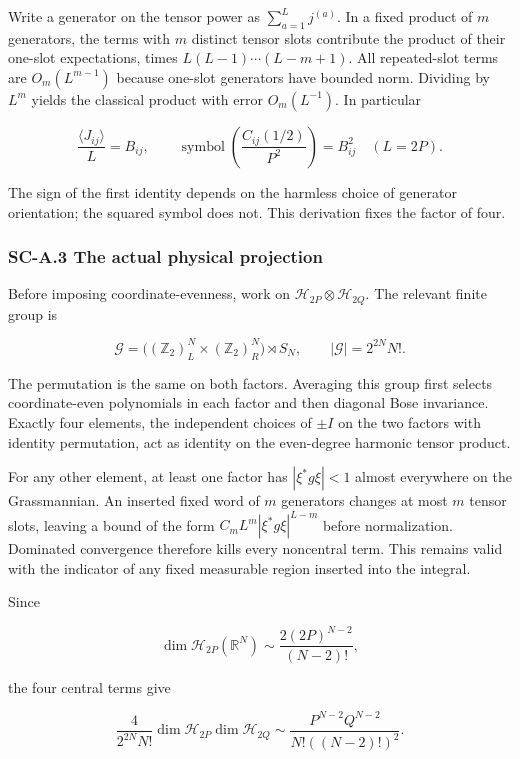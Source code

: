 \documentclass[a4paper,11pt]{article}
\numberwithin{equation}{section}
\begin{document}
Write a generator on the tensor power as \(\sum_{a=1}^L j^{(a)}\). In a fixed product of \(m\) generators, the terms with \(m\) distinct tensor slots contribute the product of their one-slot expectations, times \(L(L-1)\cdots(L-m+1)\). All repeated-slot terms are \(O_m(L^{m-1})\) because one-slot generators have bounded norm. Dividing by \(L^m\) yields the classical product with error \(O_m(L^{-1})\). In particular

\[
\frac{\langle J_{ij}\rangle}{L}=B_{ij},\qquad
\operatorname{symbol}\left(\frac{C_{ij}(1/2)}{P^2}\right)=B_{ij}^2
\quad(L=2P).
\]

The sign of the first identity depends on the harmless choice of generator orientation; the squared symbol does not. This derivation fixes the factor of four.

\hypertarget{sc-a.3-the-actual-physical-projection}{%
\subsubsection{SC-A.3 The actual physical projection}\label{sc-a.3-the-actual-physical-projection}}

Before imposing coordinate-evenness, work on \(\mathcal H_{2P}\otimes\mathcal H_{2Q}\). The relevant finite group is

\[
\mathcal G=\big((\mathbb Z_2)^N_L\times(\mathbb Z_2)^N_R\big)\rtimes S_N,
\qquad |\mathcal G|=2^{2N}N!.
\]

The permutation is the same on both factors. Averaging this group first selects coordinate-even polynomials in each factor and then diagonal Bose invariance. Exactly four elements, the independent choices of \(\pm I\) on the two factors with identity permutation, act as identity on the even-degree harmonic tensor product.

For any other element, at least one factor has \(|\xi^*g\xi|<1\) almost everywhere on the Grassmannian. An inserted fixed word of \(m\) generators changes at most \(m\) tensor slots, leaving a bound of the form \(C_m L^m|\xi^*g\xi|^{L-m}\) before normalization. Dominated convergence therefore kills every noncentral term. This remains valid with the indicator of any fixed measurable region inserted into the integral.

Since

\[
\dim\mathcal H_{2P}(\mathbb R^N)
\sim\frac{2(2P)^{N-2}}{(N-2)!},
\]

the four central terms give

\[
\frac4{2^{2N}N!}\dim\mathcal H_{2P}\dim\mathcal H_{2Q}
\sim\frac{P^{N-2}Q^{N-2}}{N!((N-2)!)^2}.
\]
\end{document}
